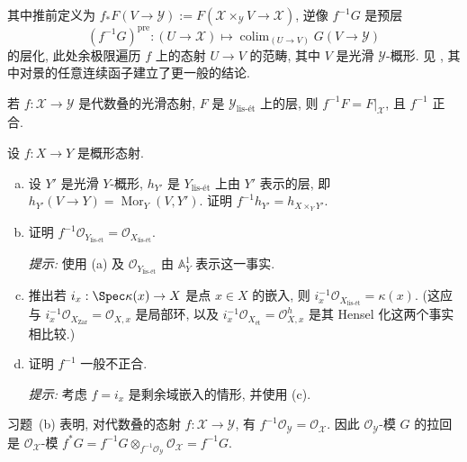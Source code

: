 其中推前定义为 $f_*F(V\to\mathcal Y):=F(\mathcal X\times_{\mathcal Y}V\to\mathcal X)$, 逆像 $f^{-1}G$ 是预层
\begin{equation}\label{src:7.1.2}
(f^{-1}G)^{\mathrm{pre}}:(U\to\mathcal X)\longmapsto\operatorname{colim}_{(U\to V)}G(V\to\mathcal Y)
\end{equation}
的层化, 此处余极限遍历 $f$ 上的态射 $U\to V$ 的范畴, 其中 $V$ 是光滑 $\mathcal Y$-概形. 见 \cite[Tag 00WX]{SP}, 其中对景的任意连续函子建立了更一般的结论.
\begin{exercise}\label{src:7.1.3}
若 $f:\mathcal X\to\mathcal Y$ 是代数叠的光滑态射, $F$ 是 $\mathcal Y_{\text{lis-ét}}$ 上的层, 则 $f^{-1}F=F|_{\mathcal X}$, 且 $f^{-1}$ 正合.
\end{exercise}
\begin{exercise}\label{src:7.1.4}
设 $f:X\to Y$ 是概形态射.
\begin{enumerate}[(a)]
\item 设 $Y'$ 是光滑 $Y$-概形, $h_{Y'}$ 是 $Y_{\text{lis-ét}}$ 上由 $Y'$ 表示的层, 即 $h_{Y'}(V\to Y)=\operatorname{Mor}_Y(V,Y')$. 证明 $f^{-1}h_{Y'}=h_{X\times_Y Y'}$.
\item 证明 $f^{-1}\mathcal O_{Y_{\text{lis-ét}}}=\mathcal O_{X_{\text{lis-ét}}}$.

\textit{提示:} 使用 (a) 及 $\mathcal O_{Y_{\text{lis-ét}}}$ 由 $\mathbb A^1_Y$ 表示这一事实.
\item 推出若 $i_x:\Spec\kappa(x)\to X$ 是点 $x\in X$ 的嵌入, 则 $i_x^{-1}\mathcal O_{X_{\text{lis-ét}}}=\kappa(x)$. (这应与 $i_x^{-1}\mathcal O_{X_{\mathrm{Zar}}}=\mathcal O_{X,x}$ 是局部环, 以及 $i_x^{-1}\mathcal O_{X_{\text{ét}}}=\mathcal O^h_{X,x}$ 是其 Hensel 化这两个事实相比较.)
\item 证明 $f^{-1}$ 一般不正合.

\textit{提示:} 考虑 $f=i_x$ 是剩余域嵌入的情形, 并使用 (c).
\end{enumerate}
\end{exercise}
习题~(b) 表明, 对代数叠的态射 $f:\mathcal X\to\mathcal Y$, 有 $f^{-1}\mathcal O_{\mathcal Y}=\mathcal O_{\mathcal X}$. 因此 $\mathcal O_{\mathcal Y}$-模 $G$ 的拉回是 $\mathcal O_{\mathcal X}$-模 $f^*G=f^{-1}G\otimes_{f^{-1}\mathcal O_{\mathcal Y}}\mathcal O_{\mathcal X}=f^{-1}G$.
